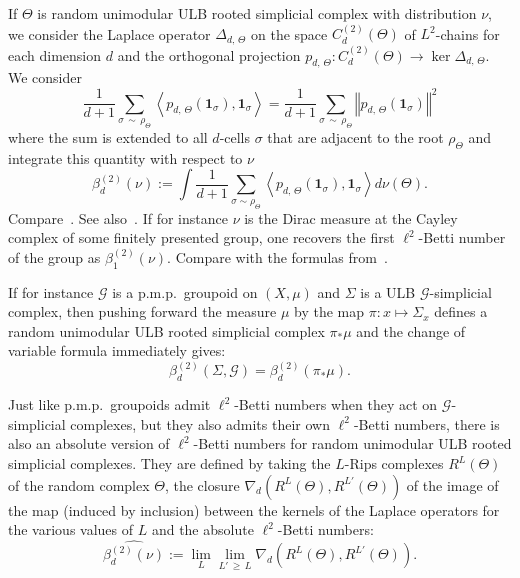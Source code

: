 \documentclass[AHL,Unicode,longabstracts,published]{cedram}
\newcommand{\cg}{\mathcal{G}}
\newcommand{\indic}{\mathbf{1}}
\newcommand{\pmp}{p.m.p.\ }
\begin{document}
\begin{rema}\label{rem: random unimodular simplicial complexes}
If $\Theta$ is random unimodular ULB rooted simplicial complex with distribution $\nu$, we consider the Laplace operator $\Delta_{d,\,\Theta}$ on the space $C^{(2)}_d(\Theta)$ of $L^2$-chains for each dimension $d$ and the orthogonal projection $p_{d,\,\Theta}: C^{(2)}_d(\Theta)\to \ker \Delta_{d,\,\Theta}$. We consider
\[
\frac{1}{d+1} \sum_{\sigma\,\sim\,\rho_{\Theta}} \left\langle p_{d,\,\Theta}(\indic_{\sigma}), \indic_{\sigma}\right\rangle=\frac{1}{d+1} \sum_{\sigma\,\sim\,\rho_{\Theta}} \left\Vert p_{d,\,\Theta}(\indic_{\sigma}) \right\Vert^2
\]
where the sum is extended to all $d$-cells $\sigma$ that are adjacent to the root $\rho_\Theta$ and integrate this quantity with respect to $\nu$
\begin{equation}
\beta_d^{(2)}(\nu):= \int \frac{1}{d+1} \sum_{\sigma\sim \rho_{\Theta}} \left\langle p_{d,\,\Theta}(\indic_{\sigma}), \indic_{\sigma}\right\rangle d\nu(\Theta).
\end{equation}
Compare~\cite{Schrodel-L2-Betti-simpl-cplx-2018}. See also~\cite{Elek-10-Betti-test}. If for instance $\nu$ is the Dirac measure at the Cayley complex of some finitely presented group, one recovers the first $\ell^2$-Betti number of the group as $\beta_1^{(2)}(\nu)$. Compare with the formulas from~\cite{Gab05}.



If for instance $\cg$ is a \pmp groupoid on $(X,\mu)$ and $\Sigma$ is a ULB $\cg$-simplicial complex, then pushing forward the measure $\mu$ by the map $\pi:x\mapsto \Sigma_x$ defines a random unimodular ULB rooted simplicial complex $\pi_*\mu$ and the change of variable formula immediately gives:
\[
\beta^{(2)}_d\left(\Sigma, \cg\right)= \beta^{(2)}_d\left(\pi_*\mu\right).
\]

Just like \pmp groupoids admit $\ell^2$-Betti numbers when they act on $\cg$-simplicial complexes, but they also admits their own $\ell^2$-Betti numbers, there is also an absolute version of $\ell^2$-Betti numbers for random unimodular ULB rooted simplicial complexes. They are defined by taking the $L$-Rips complexes $R^L(\Theta)$ of the random complex $\Theta$, the closure $\nabla_d(R^{L}(\Theta),R^{L'}(\Theta))$ of the image of the map (induced by inclusion) between the kernels of the Laplace operators for the various values of $L$ and the absolute $\ell^2$-Betti numbers:
\begin{equation}\label{eq:formula_for_betti_number random complexes}
\widehat{\beta_d^{(2)}(\nu)}:=\lim_{L} \lim_{L'\,\geq\,L} \nabla_d\left(R^{L}(\Theta),R^{L'}(\Theta)\right).
\end{equation}


\end{rema}
\end{document}
